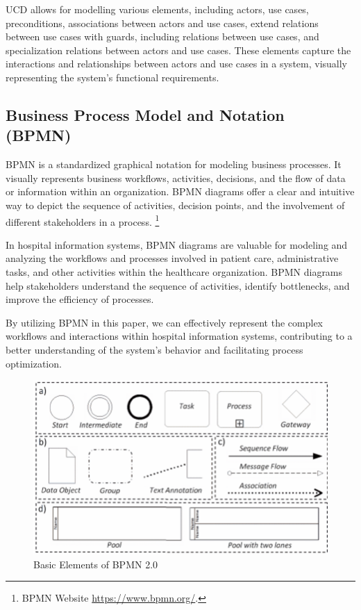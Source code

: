UCD allows for modelling various elements, including actors, use cases, preconditions, associations between actors and use cases, extend relations between use cases with guards, including relations between use cases, and specialization relations between actors and use cases. These elements capture the interactions and relationships between actors and use cases in a system, visually representing the system's functional requirements.\cite{MontiCore}


\subsection{Business Process Model and Notation (BPMN)}


BPMN is a standardized graphical notation for modeling business processes. It visually represents business workflows, activities, decisions, and the flow of data or information within an organization. BPMN diagrams offer a clear and intuitive way to depict the sequence of activities, decision points, and the involvement of different stakeholders in a process. \footnote{BPMN Website 
\url{https://www.bpmn.org/}.}

In hospital information systems, BPMN diagrams are valuable for modeling and analyzing the workflows and processes involved in patient care, administrative tasks, and other activities within the healthcare organization. BPMN diagrams help stakeholders understand the sequence of activities, identify bottlenecks, and improve the efficiency of processes. 

By utilizing BPMN in this paper, we can effectively represent the complex workflows and interactions within hospital information systems, contributing to a better understanding of the system's behavior and facilitating process optimization. \cite{Aagesen2015}



\begin{figure}[!htb]
\begin{center}\includegraphics[width=12cm]{src/pic/Basic_BPMN.png}\end{center}
\caption{Basic Elements of BPMN 2.0 \cite{BPMN_Basic}}
\label{BBPMN}
\end{figure}


\let\cleardoublepage\clearpage